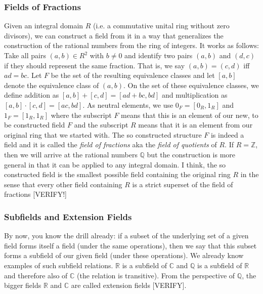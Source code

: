 \subsubsection{Fields of Fractions}
Given an integral domain $R$ (i.e. a commutative unital ring without zero divisors), we can construct a field from it in a way that generalizes the construction of the rational numbers from the ring of integers. It works as follows: Take all pairs $(a,b) \in R^2$ with $b \neq 0$ and identify two pairs $(a,b)$ and $(d,c)$ if they should represent the same fraction. That is, we say $(a,b) = (c,d)$ iff $a d = b c$. Let $F$ be the set of the resulting equivalence classes and let $[a,b]$ denote the equivalence class of $(a,b)$. On the set of these equivalence classes, we define addition as $[a,b] + [c,d] = [a d + bc, bd]$ and multiplication as  $[a,b] \cdot [c,d] = [ac, bd]$. As neutral elements, we use $0_F = [0_R, 1_R]$ and $1_F = [1_R, 1_R]$ where the subscript $F$ means that this is an element of our new, to be constructed field $F$ and the subscript $R$ means that it is an element from our original ring that we started with. The so constructed structure $F$ is indeed a field and it is called the \emph{field of fractions} aka the \emph{field of quotients} of $R$. If $R = \mathbb{Z}$, then we will arrive at the rational numbers $\mathbb{Q}$ but the construction is more general in that it can be applied to any integral domain. I think, the so constructed field is the smallest possible field containing the original ring $R$ in the sense that every other field containing $R$ is a strict superset of the field of fractions [VERIFY!]


\subsubsection{Subfields and Extension Fields}
By now, you know the drill already: if a subset of the underlying set of a given field forms itself a field (under the same operations), then we say that this subset forms a subfield of our given field (under these operations). We already know examples of such subfield relations. $\mathbb{R}$ is a subfield of $\mathbb{C}$ and $\mathbb{Q}$ is a subfield of $\mathbb{R}$ and therefore also of $\mathbb{C}$ (the relation is transitive). From the perspective of $\mathbb{Q}$, the bigger fields $\mathbb{R}$ and $\mathbb{C}$ are called extension fields [VERIFY]. 

